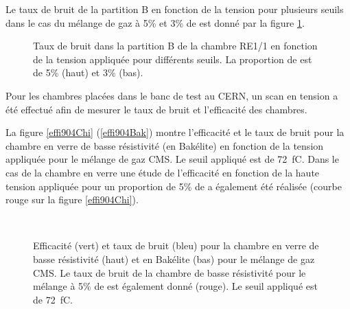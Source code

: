  Le taux de bruit de la partition B en fonction de la tension pour plusieurs seuils dans le cas du mélange de gaz à 5\% et 3\% de  est donné par la figure \ref{bruitB2}.
  
\begin{figure}[ht!]
	\centering
	\hfill
	\caption{Taux de bruit dans la partition B de la chambre RE1/1 en fonction de la tension appliquée pour différents seuils. La proportion de  est de \num{5}\% (haut) et \num{3}\% (bas).}
    \label{bruitB2}
\end{figure}  
  
Pour les chambres placées dans le banc de test au CERN, un scan en tension a été effectué afin de mesurer le taux de bruit et l'efficacité des chambres.

La figure \ref{effi904Chi} (\ref{effi904Bak}) montre l'efficacité et le taux de bruit pour la chambre en verre de basse résistivité (en Bakélite) en fonction de la tension appliquée pour le mélange de gaz CMS. Le seuil appliqué est de \SI{72}{\femto\coulomb}. Dans le cas de la chambre en verre une étude de l'efficacité en fonction de la haute tension appliquée pour un proportion de \num{5}\% de  a également été réalisée (courbe rouge sur la figure \ref{effi904Chi}).
 
\begin{figure}[ht!]
	\centering
	\\
	\vspace*{-0.2cm}
	\caption{Efficacité (vert) et taux de bruit (bleu) pour la chambre en verre de basse résistivité (haut) et en Bakélite (bas) pour le mélange de gaz CMS. Le taux de bruit de la chambre de basse résistivité pour le mélange à 5\% de  est également donné (rouge). Le seuil appliqué est de \SI{72}{\femto\coulomb}.}
\end{figure}  

